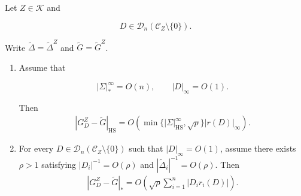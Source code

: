 \documentclass[EJP, preprint, NODS, nobera, nofontexpansion]{ejpecp}
\DeclareMathOperator{\hs}{HS}
\begin{document}
\begin{proposition}
\label{pro:two_inverse_defect_transfers}
Let \(Z\in\mathcal K\) and

\[
    D\in\mathcal D_n(\mathcal C_Z\setminus\{0\}).
\]

Write \(\widetilde\Delta=\widetilde\Delta^Z\) and
\(\widetilde G=\widetilde G^Z\).

\begin{enumerate}

\item[\textnormal{(i)}]
Assume that

\[
    |\Sigma|_*^\infty=O(n),
    \qquad
    |D|_\infty=O(1).
\]

Then
\begin{align}
\label{eq:inverse_defect_stability_hs}
|G_D^Z-\widetilde G|_{\hs}
=
O\!\left(
\min\{|\Sigma|_{\hs}^\infty,\sqrt p\}
|r(D)|_\infty
\right).
\end{align}

\item[\textnormal{(ii)}]
For every \(D\in\mathcal D_n(\mathcal C_Z\setminus\{0\})\) such that $|D|_\infty=O(1)$, assume there exists $\rho>1$ satisfying $|D_i|^{-1}=O(\rho)$ and $|\widetilde\Delta_i|^{-1}=O(\rho)$. Then
\begin{align}
\label{eq:sectorial_weighted_defects_bounded_pivots}
|G_D^Z-\widetilde G|_*
=
O\!\left(
\sqrt\rho
\sum_{i=1}^n |D_i r_i(D)|
\right).
\end{align}

\end{enumerate}
\end{proposition}
\end{document}
